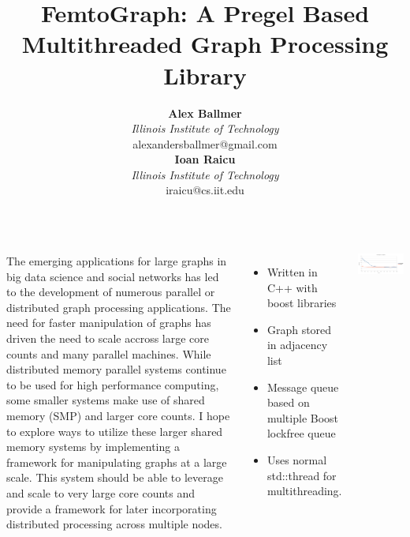\documentclass[35pt,landscape]{tikzposter}
\title{FemtoGraph: A Pregel Based Multithreaded
  Graph Processing Library}
\author{
  \textbf{Alex Ballmer}\\
  \textit{Illinois Institute of Technology}\\
  alexandersballmer@gmail.com\\
  \textbf{Ioan Raicu}\\
  \textit{Illinois Institute of Technology}\\
  iraicu@cs.iit.edu\\
}
\begin{document}
\maketitle

\begin{columns}
     {


  The emerging applications for large graphs in big data science and social networks has led to the development of numerous parallel or distributed graph processing applications. The need for faster manipulation of graphs has driven the need to scale accross large core counts and many parallel machines. While distributed memory parallel systems continue to be used for high performance computing, some smaller systems make use of shared memory (SMP) and larger core counts. I hope to explore ways to utilize these larger shared memory systems by implementing a framework for manipulating graphs at a large scale. This system should be able to leverage and scale to very large core counts and provide a framework for later incorporating distributed processing across multiple nodes.
}


     {

      \begin{itemize}
      \item Written in C++ with boost libraries
      \item Graph stored in adjacency list
      \item Message queue based on multiple Boost lockfree queue
      \item Uses normal std::thread for multithreading.
      \end{itemize}


     }
    
     {
      \setcounter{figurecounter}{98}
      \begin{tikzfigure}
        \includegraphics[width=0.95\linewidth]{vs.png}
        \end{tikzfigure}


      }

    
\end{columns}
\end{document}
